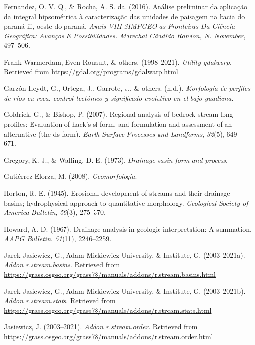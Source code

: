 \documentclass[11pt,]{article}
\begin{document}
\hypertarget{ref-fernandez2016analise}{}
Fernandez, O. V. Q., \& Rocha, A. S. da. (2016). Análise preliminar da
aplicação da integral hipsométrica à caracterização das unidades de
paisagem na bacia do paraná iii, oeste do paraná. \emph{Anais VIII
SIMPGEO-as Fronteiras Da Ciência Geográfica: Avanços E Possibilidades.
Marechal Cândido Rondon, N. November}, 497--506.

\hypertarget{ref-gdalwarp}{}
Frank Warmerdam, Even Rouault, \& others. (1998--2021). \emph{Utility
gdalwarp}. Retrieved from \url{https://gdal.org/programs/gdalwarp.html}

\hypertarget{ref-garzonmorfologia}{}
Garzón Heydt, G., Ortega, J., Garrote, J., \& others. (n.d.).
\emph{Morfología de perfiles de ríos en roca. control tectónico y
significado evolutivo en el bajo guadiana}.

\hypertarget{ref-goldrick2007regional}{}
Goldrick, G., \& Bishop, P. (2007). Regional analysis of bedrock stream
long profiles: Evaluation of hack's sl form, and formulation and
assessment of an alternative (the ds form). \emph{Earth Surface
Processes and Landforms}, \emph{32}(5), 649--671.

\hypertarget{ref-gregory1973drainage}{}
Gregory, K. J., \& Walling, D. E. (1973). \emph{Drainage basin form and
process}.

\hypertarget{ref-gutierrez2008geomorfologia}{}
Gutiérrez Elorza, M. (2008). \emph{Geomorfología}.

\hypertarget{ref-horton1945erosional}{}
Horton, R. E. (1945). Erosional development of streams and their
drainage basins; hydrophysical approach to quantitative morphology.
\emph{Geological Society of America Bulletin}, \emph{56}(3), 275--370.

\hypertarget{ref-howard1967drainage}{}
Howard, A. D. (1967). Drainage analysis in geologic interpretation: A
summation. \emph{AAPG Bulletin}, \emph{51}(11), 2246--2259.

\hypertarget{ref-streambasinsjareck}{}
Jarek Jasiewicz, G., Adam Mickiewicz University, \& Institute, G.
(2003--2021a). \emph{Addon r.stream.basins}. Retrieved from
\url{https://grass.osgeo.org/grass78/manuals/addons/r.stream.basins.html}

\hypertarget{ref-streamstats}{}
Jarek Jasiewicz, G., Adam Mickiewicz University, \& Institute, G.
(2003--2021b). \emph{Addon r.stream.stats}. Retrieved from
\url{https://grass.osgeo.org/grass78/manuals/addons/r.stream.stats.html}

\hypertarget{ref-streamorder}{}
Jasiewicz, J. (2003--2021). \emph{Addon r.stream.order}. Retrieved from
\url{https://grass.osgeo.org/grass78/manuals/addons/r.stream.order.html}
\end{document}
